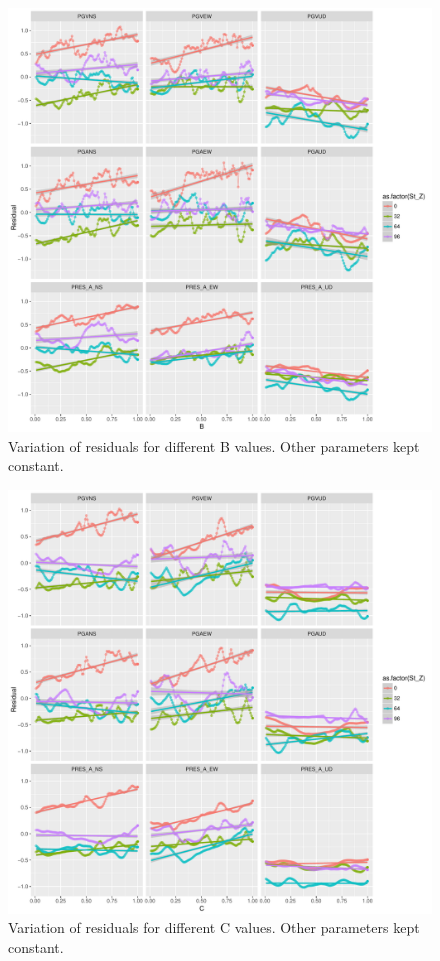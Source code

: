  \begin{figure}[H]
    \centering
    \includegraphics[width=\textwidth]{figures/pdf/B_var_AC1_H0p5_G0p25.pdf}
    \caption{Variation of residuals for different B values. Other parameters kept constant.}
    \label{fig:B_var_AC1_H0p5_G0p25}
\end{figure}

 \begin{figure}[H]
    \centering
    \includegraphics[width=\textwidth]{figures/pdf/C_var_AB1_H0p5_G0p25.pdf}
    \caption{Variation of residuals for different C values. Other parameters kept constant.}
    \label{fig:C_var_AB1_H0p5_G0p25}
\end{figure}

